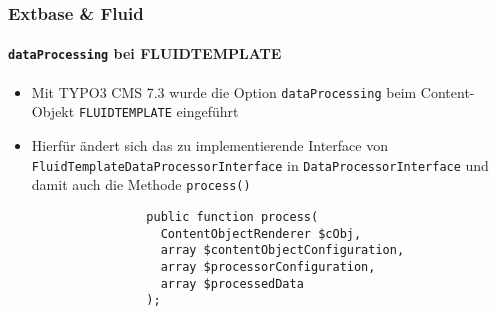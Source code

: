 \begin{frame}[fragile]
	\frametitle{Extbase \& Fluid}
	\framesubtitle{\texttt{dataProcessing} bei FLUIDTEMPLATE}

	\lstset{basicstyle=\tiny\ttfamily}

	\begin{itemize}

		\item Mit TYPO3 CMS 7.3 wurde die Option \texttt{dataProcessing} beim Content-Objekt \texttt{FLUIDTEMPLATE} eingeführt

		\item Hierfür ändert sich das zu implementierende Interface von \texttt{FluidTemplateDataProcessorInterface} in \texttt{DataProcessorInterface} und damit auch die Methode \texttt{process()}

			\begin{lstlisting}
				public function process(
				  ContentObjectRenderer $cObj,
				  array $contentObjectConfiguration,
				  array $processorConfiguration,
				  array $processedData
				);
			\end{lstlisting}

	\end{itemize}

	\breakingchange

\end{frame}

